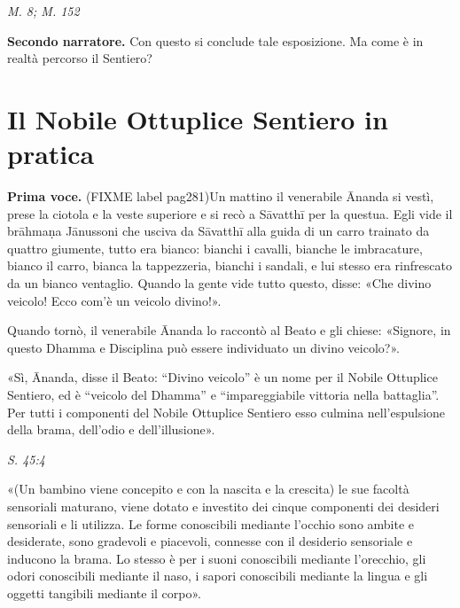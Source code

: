 \emph{M. 8; M. 152}


\textbf{Secondo narratore.} Con questo si conclude tale esposizione. Ma come è in
realtà percorso il Sentiero?


\hypertarget{x-il-nobile-ottuplice-sentiero-in-pratica}{\section*{Il Nobile Ottuplice Sentiero in pratica}}
\textbf{Prima voce.} (FIXME label pag281)Un mattino il venerabile Ānanda si vestì, prese la ciotola e
la veste superiore e si recò a Sāvatthī per la questua. Egli vide il
brāhmaṇa Jānussoni che usciva da Sāvatthī alla guida di un carro
trainato da quattro giumente, tutto era bianco: bianchi i cavalli,
bianche le imbracature, bianco il carro, bianca la tappezzeria, bianchi
i sandali, e lui stesso era rinfrescato da un bianco ventaglio. Quando
la gente vide tutto questo, disse: «Che divino veicolo! Ecco com’è un
veicolo divino!».


Quando tornò, il venerabile Ānanda lo raccontò al Beato e gli chiese:
«Signore, in questo Dhamma e Disciplina può essere individuato un divino
veicolo?».


«Sì, Ānanda, disse il Beato: “Divino veicolo” è un nome per il Nobile
Ottuplice Sentiero, ed è “veicolo del Dhamma” e “impareggiabile vittoria
nella battaglia”. Per tutti i componenti del Nobile Ottuplice Sentiero
esso culmina nell’espulsione della brama, dell’odio e dell’illusione».


\emph{S. 45:4}


«(Un bambino viene concepito e con la nascita e la crescita) le sue
facoltà sensoriali maturano, viene dotato e investito dei cinque
componenti dei desideri sensoriali e li utilizza. Le forme conoscibili
mediante l’occhio sono ambite e desiderate, sono gradevoli e piacevoli,
connesse con il desiderio sensoriale e inducono la brama. Lo stesso è
per i suoni conoscibili mediante l’orecchio, gli odori conoscibili
mediante il naso, i sapori conoscibili mediante la lingua e gli oggetti
tangibili mediante il corpo».


